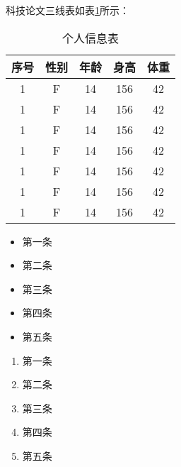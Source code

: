 \documentclass[UTF8,a4paper]{article}
\begin{document}
	科技论文三线表如表\ref{tab:aacd}所示：
	\begin{table}[htbp]
		\caption{个人信息表}
		\centering 
		\begin{tabular}{ccccc}
			\toprule
			序号 & 性别 & 年龄 & 身高 & 体重 \\
			\midrule
			1 & F & 14 & 156 & 42 \\
			1 & F & 14 & 156 & 42 \\
			1 & F & 14 & 156 & 42 \\
			1 & F & 14 & 156 & 42 \\
			1 & F & 14 & 156 & 42 \\
			1 & F & 14 & 156 & 42 \\
			1 & F & 14 & 156 & 42 \\
			\bottomrule
		\end{tabular}
		\label{tab:aacd}
	\end{table}
	
	\begin{itemize}%
		\item 第一条
		\item 第二条
		\item 第三条
		\item 第四条
		\item 第五条
	\end{itemize}
	
	
	\begin{enumerate}%
		\item 第一条
		\item 第二条
		\item 第三条
		\item 第四条
		\item 第五条 
	\end{enumerate}
\end{document}

